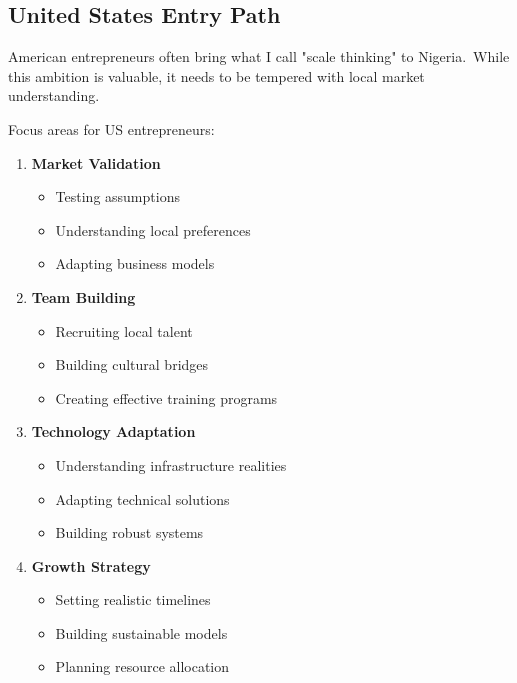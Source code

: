 \subsection{United States Entry Path}\label{subsec:united-states-entry-path}

American entrepreneurs often bring what I call "scale thinking" to Nigeria.\ While this ambition is valuable, it needs to be tempered with local market understanding.

Focus areas for US entrepreneurs:

\begin{enumerate}
    \item \textbf{Market Validation}
    \begin{itemize}
        \item Testing assumptions
        \item Understanding local preferences
        \item Adapting business models
    \end{itemize}

    \item \textbf{Team Building}
    \begin{itemize}
        \item Recruiting local talent
        \item Building cultural bridges
        \item Creating effective training programs
    \end{itemize}

    \item \textbf{Technology Adaptation}
    \begin{itemize}
        \item Understanding infrastructure realities
        \item Adapting technical solutions
        \item Building robust systems
    \end{itemize}

    \item \textbf{Growth Strategy}
    \begin{itemize}
        \item Setting realistic timelines
        \item Building sustainable models
        \item Planning resource allocation
    \end{itemize}
\end{enumerate}

